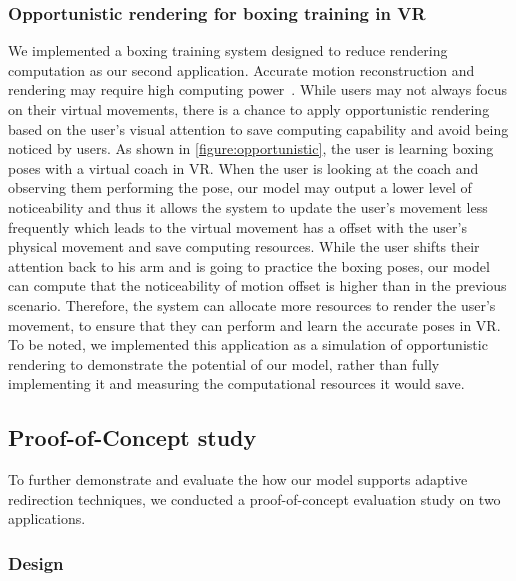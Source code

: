 \subsubsection{Opportunistic rendering for boxing training in VR}
We implemented a boxing training system designed to reduce rendering computation as our second application.
Accurate motion reconstruction and rendering may require high computing power~\cite{chen2021towards}.
While users may not always focus on their virtual movements, there is a chance to apply opportunistic rendering based on the user's visual attention to save computing capability and avoid being noticed by users.
As shown in \autoref{figure:opportunistic}, the user is learning boxing poses with a virtual coach in VR.
When the user is looking at the coach and observing them performing the pose, our model may output a lower level of noticeability and thus it allows the system to update the user's movement less frequently which leads to the virtual movement has a offset with the user's physical movement and save computing resources.
While the user shifts their attention back to his arm and is going to practice the boxing poses, our model can compute that the noticeability of motion offset is higher than in the previous scenario.
Therefore, the system can allocate more resources to render the user's movement, to ensure that they can perform and learn the accurate poses in VR.
To be noted, we implemented this application as a simulation of opportunistic rendering to demonstrate the potential of our model, rather than fully implementing it and measuring the computational resources it would save.


\subsection{Proof-of-Concept study}

To further demonstrate and evaluate the how our model supports adaptive redirection techniques, we conducted a proof-of-concept evaluation study on two applications.

\subsubsection{Design}

